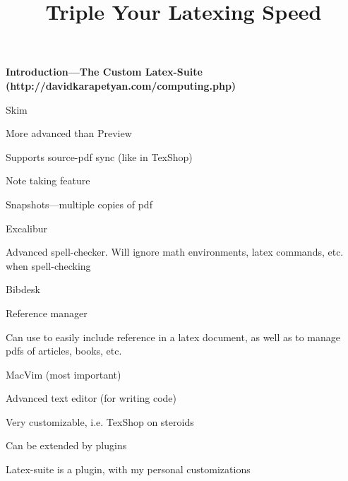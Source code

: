 \documentclass[12pt]{amsart}
\begin{document}
\title{Triple Your Latexing Speed}
\maketitle
\begin{outline}
\item{\bf Introduction---The Custom Latex-Suite \\
  (http://davidkarapetyan.com/computing.php)} 
  \begin{outline}
  \item{Skim}
    \begin{outline}
    \item{More advanced than Preview}
      \begin{outline}
      \item{Supports source-pdf sync (like in TexShop)}
      \item{Note taking feature}
      \item{Snapshots---multiple copies of pdf}
      \end{outline}

    \end{outline}
  \item{Excalibur}
    \begin{outline}
    \item{Advanced spell-checker. Will ignore math environments,
      latex commands, etc. when spell-checking}
    \end{outline}
  \item{Bibdesk}
    \begin{outline}
    \item{Reference manager}
    \item{Can use to easily include reference in a latex
      document, as well as to manage pdfs of articles,
      books, etc.}
    \end{outline}
  \item{MacVim (most important)} 
    \begin{outline}
    \item{Advanced text editor (for writing code)}
    \item{Very customizable, i.e. TexShop on steroids}
      \begin{outline}
      \item{Can be extended by plugins}
      \item{Latex-suite is a plugin, with my
        personal customizations}
      \end{outline}

    \end{outline}



\end{outline}
\end{outline}
\end{document}
